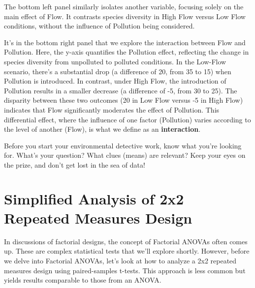 \documentclass[
  letterpaper,
  DIV=11,
  numbers=noendperiod]{scrreprt}
\begin{document}
The bottom left panel similarly isolates another variable, focusing
solely on the main effect of Flow. It contrasts species diversity in
High Flow versus Low Flow conditions, without the influence of Pollution
being considered.

It's in the bottom right panel that we explore the interaction between
Flow and Pollution. Here, the y-axis quantifies the Pollution effect,
reflecting the change in species diversity from unpolluted to polluted
conditions. In the Low-Flow scenario, there's a substantial drop (a
difference of 20, from 35 to 15) when Pollution is introduced. In
contrast, under High Flow, the introduction of Pollution results in a
smaller decrease (a difference of -5, from 30 to 25). The disparity
between these two outcomes (20 in Low Flow versus -5 in High Flow)
indicates that Flow significantly moderates the effect of Pollution.
This differential effect, where the influence of one factor (Pollution)
varies according to the level of another (Flow), is what we define as an
\textbf{interaction}.

\begin{tcolorbox}[enhanced jigsaw, title=\textcolor{quarto-callout-tip-color}{\faLightbulb}\hspace{0.5em}{Pro tip}, colframe=quarto-callout-tip-color-frame, colbacktitle=quarto-callout-tip-color!10!white, bottomtitle=1mm, leftrule=.75mm, rightrule=.15mm, titlerule=0mm, arc=.35mm, colback=white, opacitybacktitle=0.6, toprule=.15mm, toptitle=1mm, bottomrule=.15mm, coltitle=black, breakable, left=2mm, opacityback=0]

Before you start your environmental detective work, know what you're
looking for. What's your question? What clues (means) are relevant? Keep
your eyes on the prize, and don't get lost in the sea of data!

\end{tcolorbox}

\section{Simplified Analysis of 2x2 Repeated Measures
Design}\label{simplified-analysis-of-2x2-repeated-measures-design}

In discussions of factorial designs, the concept of Factorial ANOVAs
often comes up. These are complex statistical tests that we'll explore
shortly. However, before we delve into Factorial ANOVAs, let's look at
how to analyze a 2x2 repeated measures design using paired-samples
t-tests. This approach is less common but yields results comparable to
those from an ANOVA.
\end{document}
